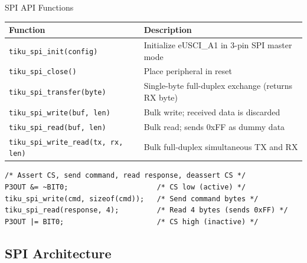 \documentclass[aspectratio=169, 10pt]{beamer}
\begin{document}
\begin{frame}[fragile]{SPI API Functions}
\begin{table}
\centering
\small
\begin{tabular}{@{}lp{8cm}@{}}
\toprule
\textbf{Function} & \textbf{Description} \\
\midrule
\texttt{tiku\_spi\_init(config)}    & Initialize eUSCI\_A1 in 3-pin SPI master mode \\
\texttt{tiku\_spi\_close()}         & Place peripheral in reset \\
\midrule
\texttt{tiku\_spi\_transfer(byte)}
    & Single-byte full-duplex exchange (returns RX byte) \\
\texttt{tiku\_spi\_write(buf, len)}
    & Bulk write; received data is discarded \\
\texttt{tiku\_spi\_read(buf, len)}
    & Bulk read; sends 0xFF as dummy data \\
\texttt{tiku\_spi\_write\_read(tx, rx, len)}
    & Bulk full-duplex simultaneous TX and RX \\
\bottomrule
\end{tabular}
\end{table}

\vspace{0.3em}
\begin{lstlisting}[style=cstyle, title={Typical SPI device interaction}]
/* Assert CS, send command, read response, deassert CS */
P3OUT &= ~BIT0;                     /* CS low (active) */
tiku_spi_write(cmd, sizeof(cmd));   /* Send command bytes */
tiku_spi_read(response, 4);         /* Read 4 bytes (sends 0xFF) */
P3OUT |= BIT0;                      /* CS high (inactive) */
\end{lstlisting}
\end{frame}

\subsection{SPI Architecture}
\end{document}
